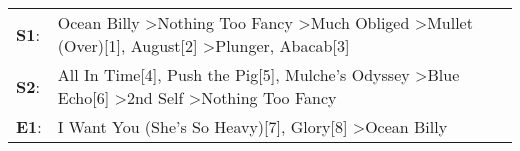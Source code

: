 \begin{supertabular}{p{0.03\textwidth}p{0.92\textwidth}}
 \textbf{S1}:  &  Ocean Billy\textsuperscript{} \textgreater \enspace Nothing Too Fancy\textsuperscript{} \textgreater \enspace Much Obliged\textsuperscript{} \textgreater \enspace Mullet (Over)[1]\textsuperscript{}, \enspace August[2]\textsuperscript{} \textgreater \enspace Plunger\textsuperscript{}, \enspace Abacab[3]\textsuperscript{}  \enspace  \\
 \textbf{S2}:  &                                          All In Time[4]\textsuperscript{}, \enspace Push the Pig[5]\textsuperscript{}, \enspace Mulche's Odyssey\textsuperscript{} \textgreater \enspace Blue Echo[6]\textsuperscript{} \textgreater \enspace 2nd Self\textsuperscript{} \textgreater \enspace Nothing Too Fancy\textsuperscript{}  \enspace  \\
 \textbf{E1}:  &                                                                                                                                                                                          I Want You (She's So Heavy)[7]\textsuperscript{}, \enspace Glory[8]\textsuperscript{} \textgreater \enspace Ocean Billy\textsuperscript{}  \enspace  \\
\end{supertabular}
